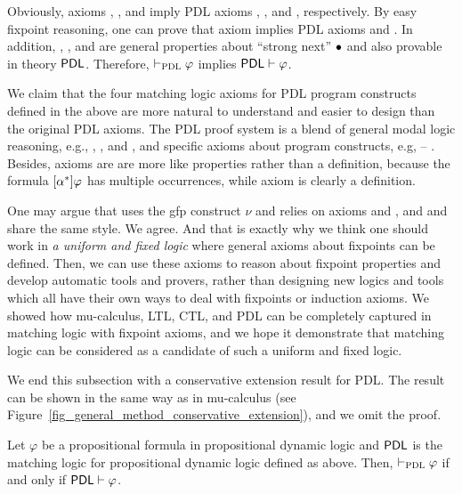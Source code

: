 \documentclass{amsart}
\begin{document}
Obviously, axioms , , and 
imply PDL axioms , , and ,
respectively.
By easy fixpoint reasoning, one can prove that
axiom  implies PDL axioms
 and .
In addition, , , and 
are general properties about ``strong next'' ${\bullet}$ and also provable in
theory $\mathsf{PDL}$.
Therefore, $\vdash_{\textsc{PDL}}\varphi$ implies $\mathsf{PDL} \vdash \varphi$.

We claim that the four matching logic axioms for PDL program constructs defined
in the above
are more natural to understand and easier to design than the original PDL
axioms.
The PDL proof system is a blend of
general modal logic reasoning, e.g., , , and
,
and specific axioms about program constructs, e.g,  --
.
Besides, axioms  are  are more like properties
rather than a definition, because
the formula $[\alpha ^*] \varphi$ has multiple occurrences, while 
axiom  is clearly a definition.

One may argue that  uses the gfp construct $\nu$
and relies on axioms \Fix and \Gfp,
and  and  share the same style.
We agree.
And that is exactly why we think one should work in \emph{a uniform and fixed
	logic}
where general axioms about fixpoints can be defined.
Then, we can use these axioms to reason about fixpoint properties
and develop automatic tools and provers, rather than 
designing new logics and tools which all have their own ways to deal with
fixpoints
or induction axioms.
We showed how mu-calculus, LTL, CTL, and PDL can be completely captured in
matching logic
with fixpoint axioms, and we hope it demonstrate that matching logic can be
considered
as a candidate of such a uniform and fixed logic.

We end this subsection with a conservative extension result for PDL.
The result can be shown in the same way as in mu-calculus 
(see Figure~\ref{fig_general_method_conservative_extension}),
and we omit the proof.
\begin{theorem}
	Let $\varphi$ be a propositional formula in propositional dynamic logic
	and $\mathsf{PDL}$ is the matching logic for propositional dynamic logic defined as
	above.
	Then, $\vdash_{\textsc{PDL}}\varphi$ if and only if $\mathsf{PDL} \vdash \varphi$.
\end{theorem}
\end{document}
